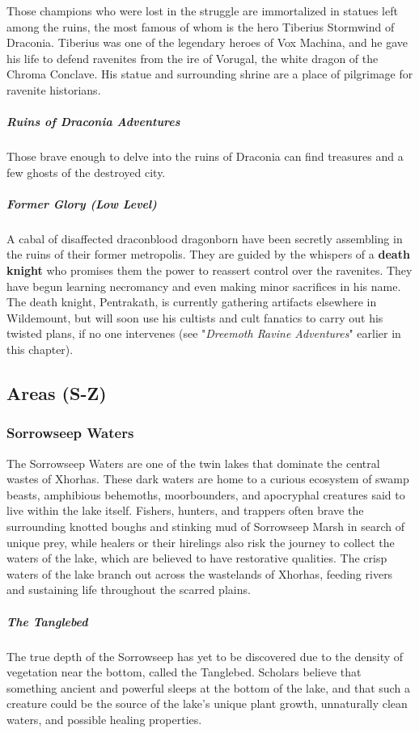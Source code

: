 \documentclass[10pt,a4paper,twoside,bg=print,twocolumn,openany,nodeprecatedcode]{dndbook}
\begin{document}
Those champions who were lost in the struggle are immortalized in statues left among the ruins, the most famous of whom is the hero Tiberius Stormwind of Draconia. Tiberius was one of the legendary heroes of Vox Machina, and he gave his life to defend ravenites from the ire of Vorugal, the white dragon of the Chroma Conclave. His statue and surrounding shrine are a place of pilgrimage for ravenite historians.

\subparagraph{Ruins of Draconia Adventures}
Those brave enough to delve into the ruins of Draconia can find treasures and a few ghosts of the destroyed city.

\subparagraph{Former Glory (Low Level)}
A cabal of disaffected draconblood dragonborn have been secretly assembling in the ruins of their former metropolis. They are guided by the whispers of a \textbf{death knight} who promises them the power to reassert control over the ravenites. They have begun learning necromancy and even making minor sacrifices in his name. The death knight, Pentrakath, is currently gathering artifacts elsewhere in Wildemount, but will soon use his cultists and cult fanatics to carry out his twisted plans, if no one intervenes (see "\textit{Dreemoth Ravine Adventures}" earlier in this chapter).

\subsection{Areas (S-Z)}
\subsubsection{Sorrowseep Waters}
The Sorrowseep Waters are one of the twin lakes that dominate the central wastes of Xhorhas. These dark waters are home to a curious ecosystem of swamp beasts, amphibious behemoths, moorbounders, and apocryphal creatures said to live within the lake itself. Fishers, hunters, and trappers often brave the surrounding knotted boughs and stinking mud of Sorrowseep Marsh in search of unique prey, while healers or their hirelings also risk the journey to collect the waters of the lake, which are believed to have restorative qualities. The crisp waters of the lake branch out across the wastelands of Xhorhas, feeding rivers and sustaining life throughout the scarred plains.

\subparagraph{The Tanglebed}
The true depth of the Sorrowseep has yet to be discovered due to the density of vegetation near the bottom, called the Tanglebed. Scholars believe that something ancient and powerful sleeps at the bottom of the lake, and that such a creature could be the source of the lake's unique plant growth, unnaturally clean waters, and possible healing properties.
\end{document}
